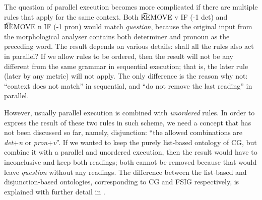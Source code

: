 The question of parallel execution becomes more complicated if 
there are multiple rules that apply for the same context. 
Both \t{REMOVE v IF (-1 det)} and \t{REMOVE n IF (-1 pron)} 
would match \emph{question}, because the original input 
from the morphological analyser contains both determiner and 
pronoun as the preceding word. 
The result depends on various details: shall all the rules also act in parallel?
If we allow rules to be ordered, then the result will not be any different from 
the same grammar in sequential execution; that is, the later rule (later by any metric) 
will not apply. 
The only difference is the reason why not: ``context does not match'' in sequential,  
and ``do not remove the last reading'' in parallel.

However, usually parallel execution is combined with \emph{unordered} rules.
In order to express the result of these two rules in such scheme, we need a concept 
that has not been discussed so far, namely, disjunction:
``the allowed combinations are {\em det}+{\em n} or {\em pron}+{\em v}''. 
If we wanted to keep the purely list-based ontology of CG, but combine it with a parallel 
and unordered execution, then the result would have to inconclusive and keep both readings; 
both cannot be removed because that would leave {\em question} without any readings.
The difference between the list-based and disjunction-based ontologies, corresponding to 
CG and FSIG respectively, is explained with further detail in \cite{lager_nivre01}.




